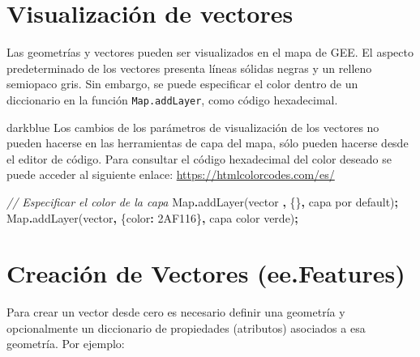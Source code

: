 \documentclass[
  12pt,
  letterpaper,
  twoside]{book}
\newenvironment{Shaded}{\begin{snugshade}}{\end{snugshade}}
\newcommand{\BuiltInTok}[1]{#1}
\newcommand{\CommentTok}[1]{\textcolor[rgb]{0.56,0.35,0.01}{\textit{#1}}}
\newcommand{\DataTypeTok}[1]{\textcolor[rgb]{0.13,0.29,0.53}{#1}}
\newcommand{\FunctionTok}[1]{\textcolor[rgb]{0.00,0.00,0.00}{#1}}
\newcommand{\NormalTok}[1]{#1}
\newcommand{\OperatorTok}[1]{\textcolor[rgb]{0.81,0.36,0.00}{\textbf{#1}}}
\newcommand{\StringTok}[1]{\textcolor[rgb]{0.31,0.60,0.02}{#1}}
\begin{document}
\hypertarget{visualizaciuxf3n-de-vectores}{%
\section{Visualización de vectores}\label{visualizaciuxf3n-de-vectores}}

Las geometrías y vectores pueden ser visualizados en el mapa de GEE. El aspecto predeterminado de los vectores presenta líneas sólidas negras y un relleno semiopaco gris. Sin embargo, se puede especificar el color dentro de un diccionario en la función \texttt{Map.addLayer}, como código hexadecimal.

\begin{bluebox2}

\begin{awesomeblock}{5pt}{\faLightbulb}{darkblue}
Los cambios de los parámetros de visualización de los vectores no pueden hacerse en las herramientas de capa del mapa, sólo pueden hacerse desde el editor de código. Para consultar el código hexadecimal del color deseado se puede acceder al siguiente enlace: \url{https://htmlcolorcodes.com/es/}

\end{awesomeblock}

\end{bluebox2}

\begin{Shaded}
\begin{Highlighting}[]
\CommentTok{// Especificar el color de la capa }
\BuiltInTok{Map}\OperatorTok{.}\FunctionTok{addLayer}\NormalTok{(vector }\OperatorTok{,}\NormalTok{ \{\}}\OperatorTok{,} \StringTok{\textquotesingle{}capa por default\textquotesingle{}}\NormalTok{)}\OperatorTok{;}
\BuiltInTok{Map}\OperatorTok{.}\FunctionTok{addLayer}\NormalTok{(vector}\OperatorTok{,}\NormalTok{ \{}\DataTypeTok{color}\OperatorTok{:} \StringTok{\textquotesingle{}2AF116\textquotesingle{}}\NormalTok{\}}\OperatorTok{,} \StringTok{\textquotesingle{}capa color verde\textquotesingle{}}\NormalTok{)}\OperatorTok{;}
\end{Highlighting}
\end{Shaded}

\hypertarget{creaciuxf3n-de-vectores-ee.features}{%
\section{Creación de Vectores (ee.Features)}\label{creaciuxf3n-de-vectores-ee.features}}

Para crear un vector desde cero es necesario definir una geometría y opcionalmente un diccionario de propiedades (atributos) asociados a esa geometría. Por ejemplo:
\end{document}
